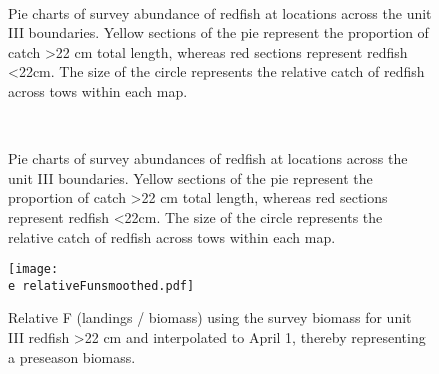 \documentclass[11pt]{article}
\newcommand{\D}{.}
\newcommand{\e}{/home/ecomod_data/redfish/figures/}
\begin{document}
\begin{landscape}
\begin{figure}
\centering
{}
\\
\caption{Pie charts of survey abundance of redfish at locations across the unit III boundaries. Yellow sections of the pie represent the proportion of catch \textgreater 22 cm total length, whereas red sections represent redfish \textless 22cm. The size of the circle represents the relative catch of redfish across tows within each map. }
\end{figure}
\clearpage


\centering
\begin{figure}
\\
\caption{Pie charts of survey abundances of redfish at locations across the unit III boundaries. Yellow sections of the pie represent the proportion of catch \textgreater 22 cm total length, whereas red sections represent redfish \textless 22cm. The size of the circle represents the relative catch of redfish across tows within each map.}

\end{figure}
\end{landscape}
\clearpage



\begin{figure}
\centering
    
    \texttt{[image: \\e relativeFunsmoothed.pdf]}
    \caption{Relative F (landings / biomass) using the survey biomass for unit III redfish \textgreater 22 cm and interpolated to April 1, thereby representing a preseason biomass.}

\end{figure}
\clearpage
\end{document}

